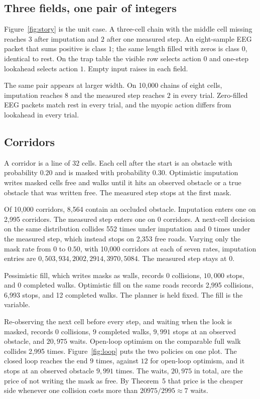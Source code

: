 \documentclass[10pt,twocolumn,letterpaper]{article}
\begin{document}
\subsection{Three fields, one pair of integers}

Figure~\ref{fig:story} is the unit case.
A three-cell chain with the middle cell missing reaches $3$ after imputation and $2$ after one measured step.
An eight-sample EEG packet that sums positive is class $1$; the same length filled with zeros is class $0$, identical to rest.
On the trap table the visible row selects action $0$ and one-step lookahead selects action $1$.
Empty input raises in each field.

The same pair appears at larger width.
On 10{,}000 chains of eight cells, imputation reaches $8$ and the measured step reaches $2$ in every trial.
Zero-filled EEG packets match rest in every trial, and the myopic action differs from lookahead in every trial.

\subsection{Corridors}

A corridor is a line of $32$ cells.
Each cell after the start is an obstacle with probability $0.20$ and is masked with probability $0.30$.
Optimistic imputation writes masked cells free and walks until it hits an observed obstacle or a true obstacle that was written free.
The measured step stops at the first mask.

Of 10{,}000 corridors, 8{,}564 contain an occluded obstacle.
Imputation enters one on 2{,}995 corridors.
The measured step enters one on $0$ corridors.
A next-cell decision on the same distribution collides 552 times under imputation and $0$ times under the measured step, which instead stops on 2{,}353 free roads.
Varying only the mask rate from $0$ to $0.50$, with 10{,}000 corridors at each of seven rates, imputation entries are $0,503,934,2002,2914,3970,5084$.
The measured step stays at $0$.

Pessimistic fill, which writes masks as walls, records $0$ collisions, $10{,}000$ stops, and $0$ completed walks.
Optimistic fill on the same roads records 2{,}995 collisions, 6{,}993 stops, and 12 completed walks.
The planner is held fixed.
The fill is the variable.

Re-observing the next cell before every step, and waiting when the look is masked, records $0$ collisions, $9$ completed walks, $9{,}991$ stops at an observed obstacle, and $20{,}975$ waits.
Open-loop optimism on the comparable full walk collides 2{,}995 times.
Figure~\ref{fig:loop} puts the two policies on one plot.
The closed loop reaches the end $9$ times, against $12$ for open-loop optimism, and it stops at an observed obstacle $9{,}991$ times.
The waits, $20{,}975$ in total, are the price of not writing the mask as free.
By Theorem~5 that price is the cheaper side whenever one collision costs more than $20975/2995\approx 7$ waits.
\end{document}
